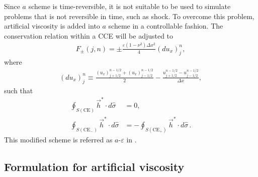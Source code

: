 \documentclass[11pt,dvips]{article}
\numberwithin{equation}{section}
\begin{document}
Since $a$ scheme is time-reversible, it is not suitable to be used to simulate
problems that is not reversible in time, such as shock.  To overcome this
problem, artificial viscosity is added into $a$ scheme in a controllable
fashion.  The conservation relation within a CCE will be adjusted to
\begin{align}
  F_{\pm}(j,n) = \pm\frac{\varepsilon(1-\nu^2)\Delta x^2}{4}(du_x)_j^n,
    \label{e:aeconserv}
\end{align}
where
\begin{align*}
  (du_x)_j^n \equiv
    \frac{(u_x)_{j+1/2}^{n-1/2} + (u_x)_{j-1/2}^{n-1/2}}{2}
  - \frac{u_{j+1/2}^{n-1/2} - u_{j-1/2}^{n-1/2}}        {\Delta x},
\end{align*}
such that
\begin{align*}
    \oint_{S(\mathrm{CE}  )}\vec{h}^*\cdot d\hat{\sigma} &= 0, \\
    \oint_{S(\mathrm{CE}_-)}\vec{h}^*\cdot d\hat{\sigma} &=
  - \oint_{S(\mathrm{CE}_+)}\vec{h}^*\cdot d\hat{\sigma} \,.
\end{align*}
This modified scheme is referred as $a$-$\varepsilon$ in
\cite{chang_method_1995}.

\subsection{Formulation for artificial viscosity}
\end{document}
